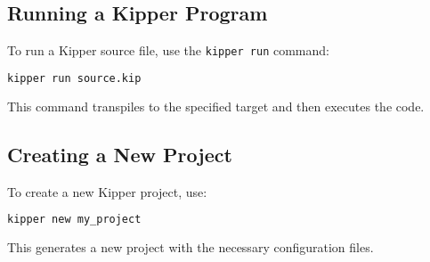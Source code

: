 \subsection{Running a Kipper Program}

To run a Kipper source file, use the \lstinline|kipper run| command:

\begin{lstlisting}[language=bash, caption=Running a Kipper File, label=lst:cli_run]
	kipper run source.kip
\end{lstlisting}

This command transpiles to the specified target and then executes the code.

\subsection{Creating a New Project}
\label{subsec:cli_new_project}

To create a new Kipper project, use:

\begin{lstlisting}[language=bash, caption=Creating a New Kipper Project, label=lst:cli_new_project]
kipper new my_project
\end{lstlisting}

This generates a new project with the necessary configuration files.

